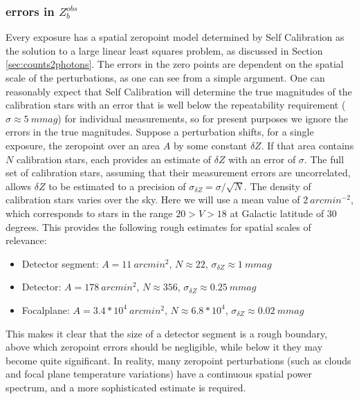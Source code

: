 \documentclass[12pt,preprint]{aastex}
\begin{document}
\subsubsection{errors in $Z_b^{obs}$}
\label{sec:Zb_errors}
Every exposure has a spatial zeropoint model determined by Self Calibration as the solution to a large linear least squares problem, as discussed in Section \ref{sec:counts2photons}.  The errors in the zero points are dependent on the spatial scale of the perturbations, as one can see from a simple argument.  One can reasonably expect that Self Calibration will determine the true magnitudes of the calibration stars with an error that is well below the repeatability requirement ($\sigma \approx 5~mmag$) for individual measurements, so for present purposes we ignore the errors in the true magnitudes.  Suppose a perturbation shifts, for a single exposure, the zeropoint over an area $A$ by some constant $\delta Z$.   If that area contains $N$ calibration stars, each provides an estimate of $\delta Z$ with an error of $\sigma$.   The full set of calibration stars, assuming that their measurement errors are uncorrelated, allows $\delta Z$ to be estimated to a precision of $\sigma_{\delta Z} = \sigma / \sqrt{N}$.  The density of calibration stars varies over the sky.  Here we will use a mean value of $2~arcmin^{-2}$, which corresponds to stars in the range $20 > V > 18$ at Galactic latitude of 30 degrees. This provides the following rough estimates for spatial scales of relevance:
\begin{itemize}
\item{Detector segment:  $A=11~arcmin^2$, $N \approx 22$, $\sigma_{\delta Z} \approx 1~mmag$}
\item{Detector: $A=178~arcmin^2$, $N \approx 356$, $\sigma_{\delta Z} \approx 0.25~mmag$}
\item{Focalplane: $A=3.4*10^4~arcmin^2$, $N \approx 6.8*10^4$, $\sigma_{\delta Z} \approx 0.02~mmag$}
\end{itemize}
This makes it clear that the size of a detector segment is a rough boundary, above which zeropoint errors should be negligible,
while below it they may become quite significant.  In reality, many zeropoint perturbations (such as clouds and focal plane temperature variations) have a continuous spatial power spectrum, and a more sophisticated estimate is required.  
\end{document}
